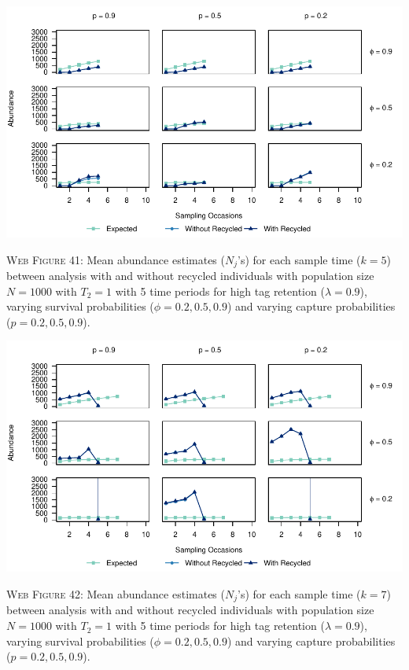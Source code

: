 \documentclass[]{article}
\begin{document}
\includegraphics{Appendix_files/figure-latex/41_abundance_H_GJSTL5-1.pdf}

\textsc{Web Figure 41:} Mean abundance estimates (\(N_j\)'s) for each
sample time (\(k=5\)) between analysis with and without recycled
individuals with population size \(N=1000\) with \(T_2=1\) with 5 time
periods for high tag retention (\(\lambda=0.9\)), varying survival
probabilities (\(\phi=0.2,0.5,0.9\)) and varying capture probabilities
(\(p=0.2,0.5,0.9\)).

\includegraphics{Appendix_files/figure-latex/42_abundance_H_GJSTL6-1.pdf}

\textsc{Web Figure 42:} Mean abundance estimates (\(N_j\)'s) for each
sample time (\(k=7\)) between analysis with and without recycled
individuals with population size \(N=1000\) with \(T_2=1\) with 5 time
periods for high tag retention (\(\lambda=0.9\)), varying survival
probabilities (\(\phi=0.2,0.5,0.9\)) and varying capture probabilities
(\(p=0.2,0.5,0.9\)).
\end{document}
